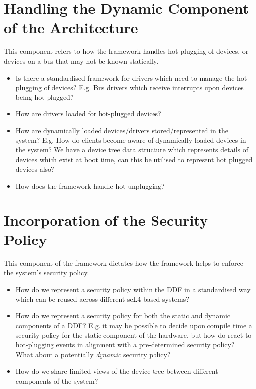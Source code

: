 \documentclass[a4paper,12pt]{report}
\begin{document}
\section{Handling  the Dynamic Component of the Architecture}

This component refers to how the framework handles hot plugging of
devices, or devices on a bus that may not be known statically.

\begin{itemize}
\item Is there a standardised framework for drivers which need to
  manage the hot plugging of devices? E.g. Bus drivers which receive
  interrupts upon devices being hot-plugged?
\item How are drivers loaded for hot-plugged devices?
\item How are dynamically loaded devices/drivers stored/represented in
  the system? E.g. How do clients become aware of dynamically loaded
  devices in the system? We have a device tree data structure which
  represents details of devices which exist at boot time, can this be
  utilised to represent hot plugged devices also?
\item How does the framework handle hot-unplugging?
\end{itemize}

\section{Incorporation of the Security Policy}

This component of the framework dictates how the framework helps to
enforce the system's security policy.

\begin{itemize}
\item How do we represent a security policy within the DDF in
  a standardised way which can be reused across different seL4
  based systems?
\item How do we represent a security policy for both the
  static and dynamic components of a DDF? E.g. it may be
  possible to decide upon compile time a security policy for
  the static component of the hardware, but how do react to
  hot-plugging events in alignment with a pre-determined
  security policy? What about a potentially \textit{dynamic}
  security policy?
\item How do we share limited views of the device tree between
  different components of the system?
\end{itemize}
\end{document}

